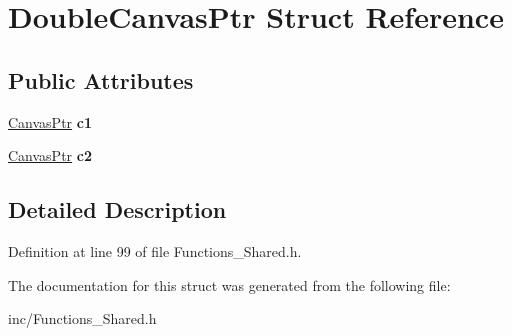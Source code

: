 \hypertarget{structDoubleCanvasPtr}{\section{Double\-Canvas\-Ptr Struct Reference}
\label{structDoubleCanvasPtr}
}
\subsection*{Public Attributes}
\begin{DoxyCompactItemize}
\item 
\hypertarget{structDoubleCanvasPtr_a8b1429eab4f3b33fab0d9c9e5463793e}{\hyperlink{structCanvasPtr}{Canvas\-Ptr} {\bfseries c1}}\label{structDoubleCanvasPtr_a8b1429eab4f3b33fab0d9c9e5463793e}

\item 
\hypertarget{structDoubleCanvasPtr_a492dc9e6fc2eb8296e807db5e44c0bed}{\hyperlink{structCanvasPtr}{Canvas\-Ptr} {\bfseries c2}}\label{structDoubleCanvasPtr_a492dc9e6fc2eb8296e807db5e44c0bed}

\end{DoxyCompactItemize}


\subsection{Detailed Description}


Definition at line 99 of file Functions\-\_\-\-Shared.\-h.



The documentation for this struct was generated from the following file\-:\begin{DoxyCompactItemize}
\item 
inc/Functions\-\_\-\-Shared.\-h\end{DoxyCompactItemize}
